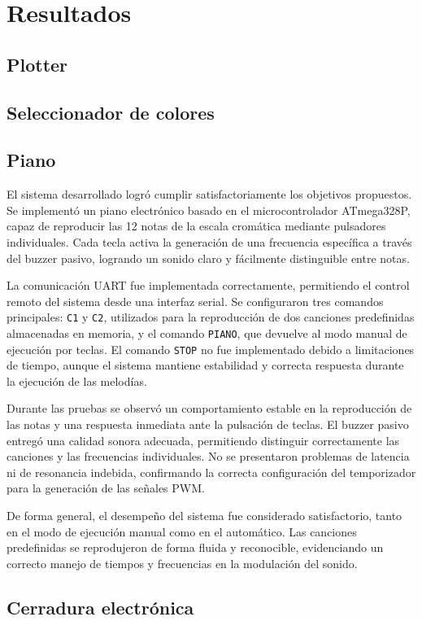 \newpage

\section{Resultados}
\subsection{Plotter}

\subsection{Seleccionador de colores}

\subsection{Piano}
El sistema desarrollado logró cumplir satisfactoriamente los objetivos propuestos. Se implementó un piano electrónico basado en el microcontrolador ATmega328P, capaz de reproducir las 12 notas de la escala cromática mediante pulsadores individuales. Cada tecla activa la generación de una frecuencia específica a través del buzzer pasivo, logrando un sonido claro y fácilmente distinguible entre notas.

La comunicación UART fue implementada correctamente, permitiendo el control remoto del sistema desde una interfaz serial. Se configuraron tres comandos principales: \texttt{C1} y \texttt{C2}, utilizados para la reproducción de dos canciones predefinidas almacenadas en memoria, y el comando \texttt{PIANO}, que devuelve al modo manual de ejecución por teclas. El comando \texttt{STOP} no fue implementado debido a limitaciones de tiempo, aunque el sistema mantiene estabilidad y correcta respuesta durante la ejecución de las melodías.

Durante las pruebas se observó un comportamiento estable en la reproducción de las notas y una respuesta inmediata ante la pulsación de teclas. El buzzer pasivo entregó una calidad sonora adecuada, permitiendo distinguir correctamente las canciones y las frecuencias individuales. No se presentaron problemas de latencia ni de resonancia indebida, confirmando la correcta configuración del temporizador para la generación de las señales PWM.

De forma general, el desempeño del sistema fue considerado satisfactorio, tanto en el modo de ejecución manual como en el automático. Las canciones predefinidas se reprodujeron de forma fluida y reconocible, evidenciando un correcto manejo de tiempos y frecuencias en la modulación del sonido.


\subsection{Cerradura electrónica}
